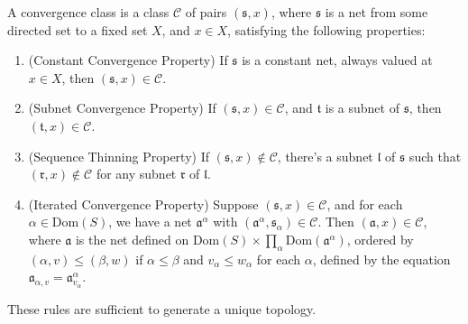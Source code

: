 A convergence class is a class $\mathcal{C}$ of pairs $(\mathfrak{s},x)$, where $\mathfrak{s}$ is a net from some directed set to a fixed set $X$, and $x \in X$, satisfying the following properties:
%
\begin{enumerate}
    \item (Constant Convergence Property) If $\mathfrak{s}$ is a constant net, always valued at $x \in X$, then $(\mathfrak{s},x) \in \mathcal{C}$.
    \item (Subnet Convergence Property) If $(\mathfrak{s},x) \in \mathcal{C}$, and $\mathfrak{t}$ is a subnet of $\mathfrak{s}$, then $(\mathfrak{t},x) \in \mathcal{C}$.
    \item (Sequence Thinning Property) If $(\mathfrak{s},x) \not \in \mathcal{C}$, there's a subnet $\mathfrak{l}$ of $\mathfrak{s}$ such that $(\mathfrak{r},x) \not \in \mathcal{C}$ for any subnet $\mathfrak{r}$ of $\mathfrak{l}$.
    \item (Iterated Convergence Property) Suppose $(\mathfrak{s},x) \in \mathcal{C}$, and for each $\alpha \in \text{Dom}(S)$, we have a net $\mathfrak{a}^\alpha$ with $(\mathfrak{a}^\alpha, \mathfrak{s}_\alpha) \in \mathcal{C}$. Then $(\mathfrak{a},x) \in \mathcal{C}$, where $\mathfrak{a}$ is the net defined on $\text{Dom}(S) \times \prod_{\alpha} \text{Dom}(\mathfrak{a}^\alpha)$, ordered by $(\alpha, v) \leq (\beta, w)$ if $\alpha \leq \beta$ and $v_\alpha \leq w_\alpha$ for each $\alpha$, defined by the equation $\mathfrak{a}_{\alpha, v} = \mathfrak{a}^\alpha_{v_\alpha}$.
\end{enumerate}
%
These rules are sufficient to generate a unique topology.


